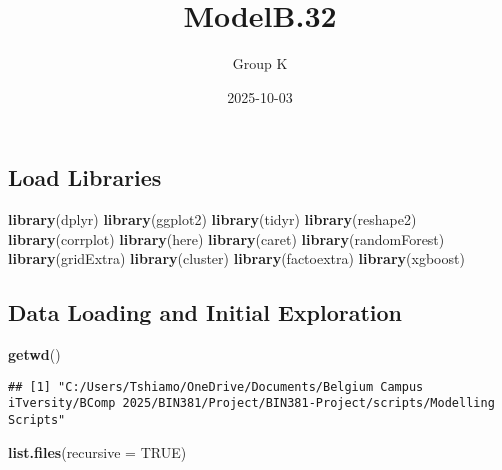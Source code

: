 \documentclass[
]{article}
\title{ModelB.32}
\author{Group K}
\date{2025-10-03}
\newenvironment{Shaded}{\begin{snugshade}}{\end{snugshade}}
\newcommand{\AttributeTok}[1]{\textcolor[rgb]{0.13,0.29,0.53}{#1}}
\newcommand{\ConstantTok}[1]{\textcolor[rgb]{0.56,0.35,0.01}{#1}}
\newcommand{\FunctionTok}[1]{\textcolor[rgb]{0.13,0.29,0.53}{\textbf{#1}}}
\newcommand{\NormalTok}[1]{#1}
\begin{document}
\maketitle

\subsection{Load Libraries}\label{load-libraries}

\begin{Shaded}
\begin{Highlighting}[]
\FunctionTok{library}\NormalTok{(dplyr)}
\FunctionTok{library}\NormalTok{(ggplot2)}
\FunctionTok{library}\NormalTok{(tidyr)}
\FunctionTok{library}\NormalTok{(reshape2)}
\FunctionTok{library}\NormalTok{(corrplot)}
\FunctionTok{library}\NormalTok{(here)}
\FunctionTok{library}\NormalTok{(caret)}
\FunctionTok{library}\NormalTok{(randomForest)}
\FunctionTok{library}\NormalTok{(gridExtra)}
\FunctionTok{library}\NormalTok{(cluster)}
\FunctionTok{library}\NormalTok{(factoextra)}
\FunctionTok{library}\NormalTok{(xgboost)}
\end{Highlighting}
\end{Shaded}

\subsection{Data Loading and Initial
Exploration}\label{data-loading-and-initial-exploration}

\begin{Shaded}
\begin{Highlighting}[]
\FunctionTok{getwd}\NormalTok{()}
\end{Highlighting}
\end{Shaded}

\begin{verbatim}
## [1] "C:/Users/Tshiamo/OneDrive/Documents/Belgium Campus iTversity/BComp 2025/BIN381/Project/BIN381-Project/scripts/Modelling Scripts"
\end{verbatim}

\begin{Shaded}
\begin{Highlighting}[]
\FunctionTok{list.files}\NormalTok{(}\AttributeTok{recursive =} \ConstantTok{TRUE}\NormalTok{) }
\end{Highlighting}
\end{Shaded}
\end{document}
